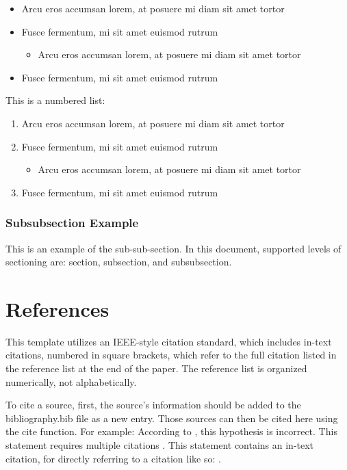 \documentclass[
	a4paper, %
	10pt, %
]{LTJournalArticle}
\begin{document}
\begin{itemize}
	\item Arcu eros accumsan lorem, at posuere mi diam sit amet tortor
	\item Fusce fermentum, mi sit amet euismod rutrum
        \begin{itemize}
            \item Arcu eros accumsan lorem, at posuere mi diam sit amet tortor
        \end{itemize}
        \item Fusce fermentum, mi sit amet euismod rutrum
\end{itemize}

This is a numbered list:

\begin{enumerate}
	\item Arcu eros accumsan lorem, at posuere mi diam sit amet tortor
	\item Fusce fermentum, mi sit amet euismod rutrum
        \begin{itemize}
            \item Arcu eros accumsan lorem, at posuere mi diam sit amet tortor
        \end{itemize}
        \item Fusce fermentum, mi sit amet euismod rutrum
\end{enumerate}

\subsubsection{Subsubsection Example}

This is an example of the sub-sub-section. In this document, supported levels of sectioning are: section, subsection, and subsubsection.

\section{References}
This template utilizes an IEEE-style citation standard, which includes in-text citations, numbered in square brackets, which refer to the full citation listed in the reference list at the end of the paper. The reference list is organized numerically, not alphabetically.

To cite a source, first, the source's information should be added to the bibliography.bib file as a new entry. Those sources can then be cited here using the cite function. For example: According to \cite{Smith:2024jd}, this hypothesis is incorrect. This statement requires multiple citations \autocite{Smith:2023qr, Smith:2024jd}. This statement contains an in-text citation, for directly referring to a citation like so: \textcite{Smith:2024jd}.
\end{document}
